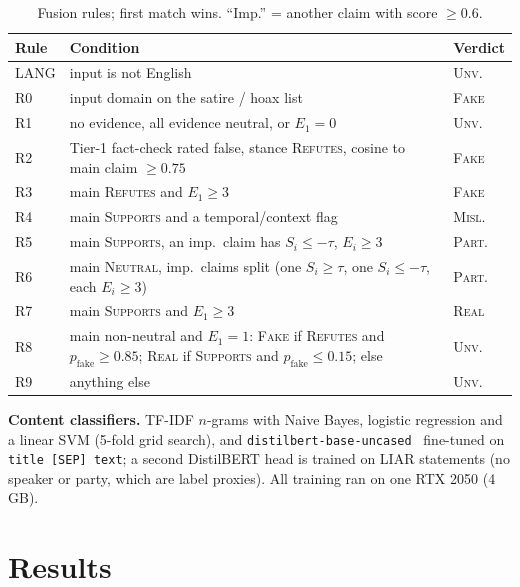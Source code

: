 \documentclass[conference]{IEEEtran}
\newcommand{\cls}[1]{\textsc{#1}}          %
\begin{document}
\begin{table}[t]
\caption{Fusion rules; first match wins. ``Imp.'' = another claim with score $\geq 0.6$.}
\label{tab:rules}
\centering\footnotesize
\setlength{\tabcolsep}{3pt}
\begin{tabular}{@{}l p{5.3cm} l@{}}
\toprule
Rule & Condition & Verdict \\
\midrule
LANG & input is not English & \cls{Unv.} \\
R0 & input domain on the satire / hoax list & \cls{Fake} \\
R1 & no evidence, all evidence neutral, or $E_1=0$ & \cls{Unv.} \\
R2 & Tier-1 fact-check rated false, stance \textsc{Refutes}, cosine to main claim $\geq 0.75$ & \cls{Fake} \\
R3 & main \textsc{Refutes} and $E_1\geq 3$ & \cls{Fake} \\
R4 & main \textsc{Supports} and a temporal/context flag & \cls{Misl.} \\
R5 & main \textsc{Supports}, an imp.\ claim has $S_i\leq-\tau$, $E_i\geq 3$ & \cls{Part.} \\
R6 & main \textsc{Neutral}, imp.\ claims split (one $S_i\geq\tau$, one $S_i\leq-\tau$, each $E_i\geq 3$) & \cls{Part.} \\
R7 & main \textsc{Supports} and $E_1\geq 3$ & \cls{Real} \\
R8 & main non-neutral and $E_1=1$: \cls{Fake} if \textsc{Refutes} and $p_\mathrm{fake}\geq 0.85$; \cls{Real} if \textsc{Supports} and $p_\mathrm{fake}\leq 0.15$; else & \cls{Unv.} \\
R9 & anything else & \cls{Unv.} \\
\bottomrule
\end{tabular}
\end{table}

\textbf{Content classifiers.} TF-IDF $n$-grams with Naive Bayes, logistic regression and a linear SVM (5-fold grid search), and \texttt{distilbert-base-uncased}~\cite{sanh2019distilbert,wolf2020transformers} fine-tuned on \texttt{title [SEP] text}; a second DistilBERT head is trained on LIAR statements (no speaker or party, which are label proxies). All training ran on one RTX 2050 (4\,GB).

\section{Results}\label{sec:results}
\end{document}
